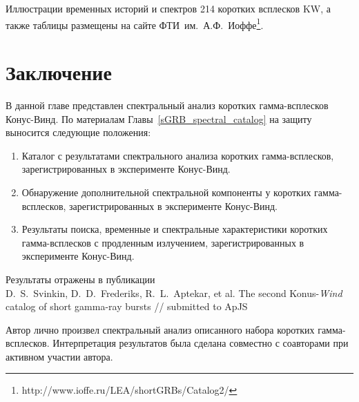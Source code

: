 Иллюстрации временных историй и спектров 214 коротких всплесков KW, а также таблицы размещены на сайте
ФТИ~им.~А.Ф.~Иоффе\footnote{http://www.ioffe.ru/LEA/shortGRBs/Catalog2/}.

\section{Заключение}
В данной главе представлен спектральный анализ коротких гамма-всплесков Конус-Винд.
По материалам Главы~\ref{sGRB_spectral_catalog} на защиту выносится следующие положения:
\begin{enumerate}
\item Каталог с результатами спектрального анализа коротких гамма-всплесков, 
    зарегистрированных в эксперименте Конус-Винд.
\item Обнаружение дополнительной спектральной компоненты у коротких гамма-всплесков, 
    зарегистрированных в эксперименте Конус-Винд.
\item Результаты поиска, временные и спектральные характеристики коротких гамма-всплесков 
    с продленным излучением, зарегистрированных в эксперименте Конус-Винд.
\end{enumerate}

Результаты отражены в публикации\\
D.~S.~Svinkin, D.~D.~Frederiks, R.~L.~Aptekar, et al. 
The second Konus-\textit{Wind} catalog of short gamma-ray bursts //
submitted to ApJS

Автор лично произвел спектральный анализ описанного набора коротких гамма-всплесков.
Интерпретация результатов была сделана совместно с соавторами при активном участии автора.

\clearpage